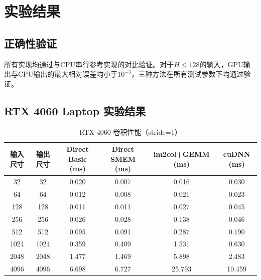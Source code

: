 \documentclass[a4paper]{article}
\begin{document}
\section{实验结果}

\subsection{正确性验证}

所有实现均通过与CPU串行参考实现的对比验证。对于$H\leq 128$的输入，GPU输出与CPU输出的最大相对误差均小于$10^{-3}$，三种方法在所有测试参数下均通过验证。

\subsection{RTX 4060 Laptop 实验结果}

\begin{table}[H]
    \centering
    \small
    \caption{RTX 4060 卷积性能（stride=1）}
    \begin{tabular}{cccccc}
        \toprule
        \textbf{输入尺寸} & \textbf{输出尺寸} & \textbf{Direct Basic (ms)} & \textbf{Direct SMEM (ms)} & \textbf{im2col+GEMM (ms)} & \textbf{cuDNN (ms)} \\
        \midrule
        32    & 32    & 0.020 & 0.007 & 0.016 & 0.030 \\
        64    & 64    & 0.012 & 0.008 & 0.021 & 0.023 \\
        128   & 128   & 0.011 & 0.011 & 0.027 & 0.045 \\
        256   & 256   & 0.026 & 0.028 & 0.138 & 0.046 \\
        512   & 512   & 0.095 & 0.091 & 0.287 & 0.190 \\
        1024  & 1024  & 0.359 & 0.409 & 1.531 & 0.630 \\
        2048  & 2048  & 1.477 & 1.469 & 5.898 & 2.483 \\
        4096  & 4096  & 6.698 & 6.727 & 25.793 & 10.459 \\
        \bottomrule
    \end{tabular}
\end{table}
\end{document}
